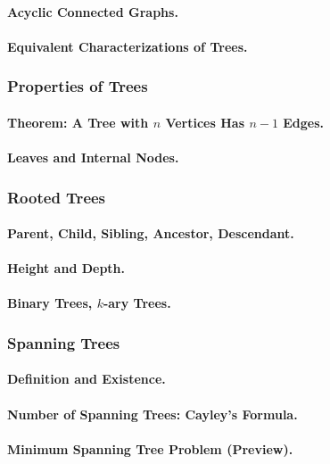 \paragraph{Acyclic Connected Graphs.}
\paragraph{Equivalent Characterizations of Trees.}

\subsubsection{Properties of Trees}
\paragraph{Theorem: A Tree with $n$ Vertices Has $n-1$ Edges.}
\paragraph{Leaves and Internal Nodes.}

\subsubsection{Rooted Trees}
\paragraph{Parent, Child, Sibling, Ancestor, Descendant.}
\paragraph{Height and Depth.}
\paragraph{Binary Trees, $k$-ary Trees.}

\subsubsection{Spanning Trees}
\paragraph{Definition and Existence.}
\paragraph{Number of Spanning Trees: Cayley's Formula.}
\paragraph{Minimum Spanning Tree Problem (Preview).}

